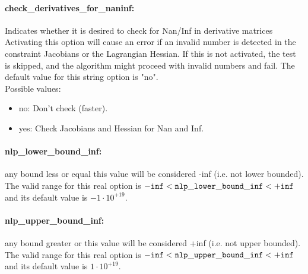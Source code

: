 \paragraph{check\_derivatives\_for\_naninf:}\label{sec:check_derivatives_for_naninf} Indicates whether it is desired to check for Nan/Inf in derivative matrices $\;$ \\
 Activating this option will cause an error if an
invalid number is detected in the constraint
Jacobians or the Lagrangian Hessian.  If this is
not activated, the test is skipped, and the
algorithm might proceed with invalid numbers and
fail.
The default value for this string option is "no".
\\ 
Possible values:
\begin{itemize}
   \item no: Don't check (faster).
   \item yes: Check Jacobians and Hessian for Nan and Inf.
\end{itemize}

\paragraph{nlp\_lower\_bound\_inf:}\label{sec:nlp_lower_bound_inf} any bound less or equal this value will be considered -inf (i.e. not lower bounded). $\;$ \\
 The valid range for this real option is 
${\tt -inf} <  {\tt nlp\_lower\_bound\_inf } <  {\tt +inf}$
and its default value is $-1 \cdot 10^{+19}$.


\paragraph{nlp\_upper\_bound\_inf:}\label{sec:nlp_upper_bound_inf} any bound greater or this value will be considered +inf (i.e. not upper bounded). $\;$ \\
 The valid range for this real option is 
${\tt -inf} <  {\tt nlp\_upper\_bound\_inf } <  {\tt +inf}$
and its default value is $1 \cdot 10^{+19}$.


